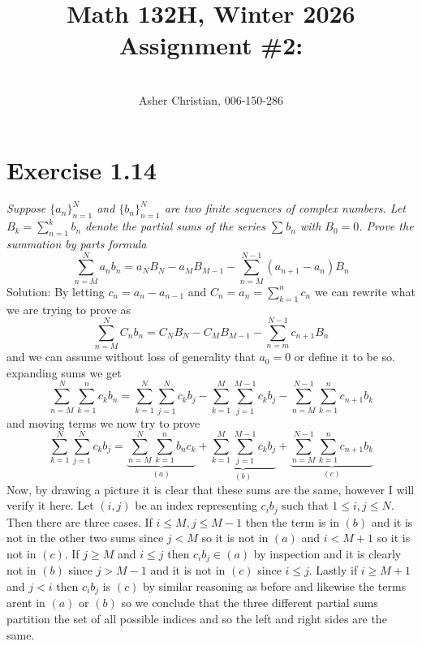 \documentclass[11pt]{article}
\newcommand{\cnum}{Math 132H}
\newcommand{\ced}{Winter 2026}
\newcommand{\ctitle}[4]{\title{\vspace{-0.5in}\cnum, \ced\\Assignment #1: #2}\author{\vspace{-0.35in}\\#3, #4}}
\newcommand{\solution}[1]{{{\textcolor{header}{Solution:} \textcolor{solution}{#1}}}}
\begin{document}
\ctitle{\#2}{}{Asher Christian}{006-150-286}
\date{}
\maketitle

\section{Exercise 1.14}
\emph{
    Suppose $\{a_n\}_{n=1}^{N}$ and $\{b_n\}_{n=1}^{N}$ are two finite sequences of complex numbers.
    Let $B_k = \sum_{n=1}^{k}b_n$ denote the partial sums of the series $\sum_{}^{}b_n$ with $B_0 = 0$.
    Prove the summation by parts formula
    \[
        \sum_{n=M}^{N}a_nb_n = a_NB_N - a_MB_{M-1} - \sum_{n=M}^{N-1}(a_{n+1}-a_n)B_n
    \] 
}
\solution{
    By letting $c_n = a_n - a_{n-1}$ and  $C_n = a_n = \sum_{k=1}^{n}c_n$ we can rewrite what we are trying to prove as
    \[
        \sum_{n=M}^{N}C_nb_n = C_NB_N - C_MB_{M-1} - \sum_{n=m}^{N-1}c_{n+1}B_n
    \] 
    and we can assume without loss of generality that $a_0 = 0$ or define it to be so.
    expanding sums we get
    \[
        \sum_{n=M}^{N}\sum_{k=1}^{n}c_kb_n = \sum_{k=1}^{N}\sum_{j=1}^{N}c_kb_j - \sum_{k=1}^{M}\sum_{j=1}^{M-1}c_kb_j - \sum_{n=M}^{N-1}\sum_{k=1}^{n}c_{n+1}b_k
    \] 
    and moving terms we now try to prove
    \[
        \sum_{k=1}^{N}\sum_{j=1}^{N}c_kb_j = \underbrace{\sum_{n=M}^{N}\sum_{k=1}^{n}b_nc_k}_{(a)} + \underbrace{\sum_{k=1}^{M}\sum_{j=1}^{M-1}c_kb_j}_{(b)} + \underbrace{\sum_{n=M}^{N-1}\sum_{k=1}^{n}c_{n+1}b_k}_{(c)}
    \] 
    Now, by drawing a picture it is clear that these sums are the same, however I will verify it here.
    Let $(i,j)$ be an index representing $c_i b_j$ such that  $1 \le i,j \le N$. Then there are three cases. If  $i \le M, j \le M-1$ then the term
    is in $(b)$
    and it is not in the other two sums since $j < M $ so it is not in  $(a)$ and $i < M+1$ so it is not in  $(c)$.
    If $j \ge M$ and  $i \le j$ then  $c_ib_j \in (a)$ by inspection and it is clearly not in  $(b)$ since  $j > M-1$ and it is not in  $(c)$ since $i \le j$.
    Lastly if $i \ge M+1$ and  $j < i$ then  $c_ib_j $ is  $(c)$ by similar reasoning as before and likewise the terms arent in  $(a)$ or  $(b)$ so we conclude that the 
    three different partial sums partition the set of all possible indices and so the left and right sides are the same.
}
\end{document}
